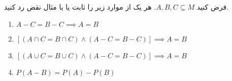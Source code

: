 فرض کنید $A, B, C \subseteq M$. هر یک از موارد زیر را ثابت یا با مثال نقض رد کنید.

\begin{enumerate}
	\item[] $A - C = B - C \implies A = B$
	\item[] $[(A \cap C = B \cap C) \land (A - C = B - C)] \implies A = B$
	\item[] $[(A \cup C = B \cup C) \land (A - C = B - C)] \implies A = B$
	\item[] $P(A - B) = P(A) - P(B)$
\end{enumerate}